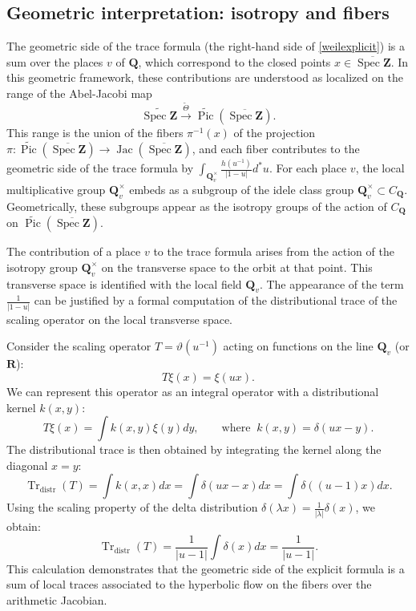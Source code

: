 \documentclass[11pt,a4paper]{article}
\newcommand{\Q}{\mathbf{Q}}
\newcommand{\Z}{\mathbf{Z}}
\newcommand{\R}{\mathbf{R}}
\def\spz{\Spec \Z}
\def\spzb{\overline{\Spec \Z}}
\newcommand{\Spec}{\operatorname{Spec}}
\def\Pic{\operatorname{Pic}}
\def\Jac{\operatorname{Jac}}
\def\tspz{\widetilde{\Pic}(\spzb)}
\def\spz{\Spec \Z}
\theoremstyle{plain}
\theoremstyle{definition} %
\begin{document}
\subsection{Geometric interpretation: isotropy and fibers}\label{geomtrace}

The geometric side of the trace formula (the right-hand side of \eqref{weilexplicit}) is a sum over the places $v$ of $\Q$, which correspond to the closed points $x \in \spzb$.
In this geometric framework, these contributions are understood as localized on the range of the Abel-Jacobi map
$$
\widetilde{ \spz}\stackrel{\tilde\Theta}{\longrightarrow} \tspz.
$$
This range is the union 
 of the fibers $\pi^{-1}(x)$ of the projection $\pi: \tspz \to \Jac(\spzb)$, and each fiber contributes to the geometric side of the trace formula by $\int_{\Q_v^\times} \frac{h(u^{-1})}{|1-u|} d^* u$. 
For each place $v$, the local multiplicative group $\Q_v^\times$ embeds as a subgroup of the idele class group $\Q_v^\times \subset C_\Q$.
Geometrically, these subgroups appear as the isotropy groups of the action of $C_\Q$ on  $\tspz$. 

The contribution of a place $v$ to the trace formula arises from the action of the isotropy group $\Q_v^\times$ on the transverse space to the orbit at that point. This transverse space is identified with the local field $\Q_v$.
The appearance of the term $\frac{1}{|1-u|}$ can be justified by a formal computation of the distributional trace of the scaling operator on the local transverse space.

Consider the scaling operator $T = \vartheta(u^{-1})$ acting on functions on the line $\Q_v$ (or $\R$):
\[
T \xi(x) = \xi(u x).
\]
We can represent this operator as an integral operator with a distributional kernel $k(x, y)$:
\[
T \xi(x) = \int k(x, y) \xi(y) dy, \qquad \text{where }~ k(x, y) = \delta(u x - y).
\]
The distributional trace is then obtained by integrating the kernel along the diagonal $x=y$:
\[
\operatorname{Tr}_{\text{distr}}(T) = \int k(x, x) dx = \int \delta(u x - x) dx = \int \delta((u-1)x) dx.
\]
Using the scaling property of the delta distribution $\delta(\lambda x) = \frac{1}{|\lambda|} \delta(x)$, we obtain:
\[
\operatorname{Tr}_{\text{distr}}(T) = \frac{1}{|u-1|} \int \delta(x) dx = \frac{1}{|u-1|}.
\]
This calculation demonstrates that the geometric side of the explicit formula is a sum of local traces associated to the hyperbolic flow on the fibers over the arithmetic  Jacobian.
\end{document}

